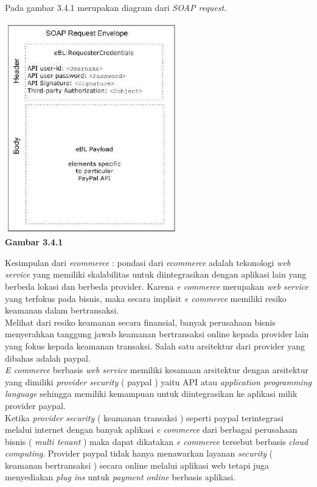 Pada gambar 3.4.1 merupakan diagram dari \textit{SOAP request.}
\begin{center}
\includegraphics[scale=1]{Gambar341.jpg} \\
\textbf{Gambar 3.4.1}
\end{center}
\tab Kesimpulan dari \textit{ecommerce} : pondasi dari \textit{ecommerce} adalah tekonologi \textit{web service} yang memiliki skalabilitas untuk diintegrasikan dengan aplikasi lain yang berbeda lokasi dan berbeda provider. Karena \textit{e commerce} merupakan \textit{web service} yang terfokus pada bisnis, maka secara implisit \textit{e commerce} memiliki resiko keamanan dalam bertransaksi.\\
\tab Melihat dari resiko keamanan secara finansial, banyak perusahaan bisnis menyerahkan tanggung jawab keamanan bertransaksi online kepada provider lain yang fokus kepada keamanan transaksi. Salah satu arsitektur dari provider yang dibahas adalah paypal.\\
\tab \textit{E commerce} berbasis \textit{web service} memiliki kesamaan arsitektur dengan arsitektur yang dimiliki \textit{provider security} ( paypal ) yaitu API atau \textit{application programming language} sehingga memiliki kemampuan untuk diintegrasikan ke aplikasi milik provider paypal.\\
\tab Ketika \textit{provider security} ( keamanan transaksi ) seperti paypal terintegrasi melalui internet dengan banyak aplikasi \textit{e commerce} dari berbagai perusahaan bisnis (\textit{ multi tenant} ) maka dapat dikatakan \textit{e commerce} tersebut berbasis \textit{cloud computing}.
Provider paypal tidak hanya menawarkan layanan \textit{security} ( keamanan bertransaksi ) secara online melalui aplikasi web tetapi juga menyediakan \textit{plug ins} untuk \textit{payment online} berbasis aplikasi.\\

